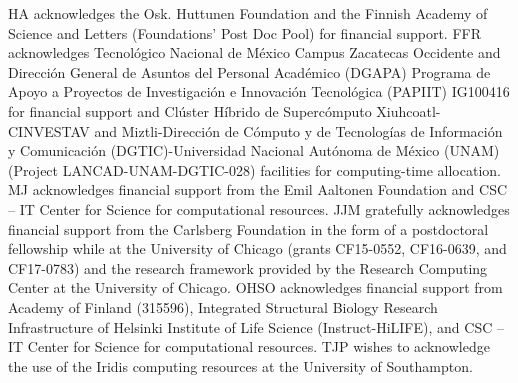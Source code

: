 \documentclass[journal=jpcbfk,manuscript=article]{achemso}
\begin{document}
\begin{acknowledgement}
  HA acknowledges the Osk. Huttunen Foundation and the Finnish Academy of Science and Letters (Foundations' Post Doc Pool) for financial support.
  FFR acknowledges Tecnol\'{o}gico Nacional de M\'{e}xico Campus Zacatecas Occidente and
  Direcci\'{o}n General de Asuntos del Personal Acad\'{e}mico (DGAPA)
  Programa de Apoyo a Proyectos de Investigaci\'{o}n e Innovaci\'{o}n
  Tecnol\'{o}gica (PAPIIT) IG100416 for financial support and Cl\'{u}ster
  H\'{i}brido de Superc\'{o}mputo Xiuhcoatl-CINVESTAV and Miztli-Direcci\'{o}n de
  C\'{o}mputo y de Tecnolog\'{i}as de Informaci\'{o}n y Comunicaci\'{o}n (DGTIC)-Universidad Nacional Aut\'{o}noma de M\'{e}xico (UNAM) (Project
  LANCAD-UNAM-DGTIC-028) facilities for computing-time allocation.
  MJ acknowledges financial support from the Emil Aaltonen Foundation
  and CSC -- IT Center for Science for computational resources.
  JJM gratefully acknowledges financial support from the Carlsberg Foundation in the form of a postdoctoral fellowship while at the University of Chicago (grants CF15-0552, CF16-0639, and CF17-0783) and the research framework provided by the Research Computing Center at the University of Chicago.
  OHSO acknowledges financial support from Academy of Finland (315596),
  Integrated Structural Biology Research Infrastructure of
  Helsinki Institute of Life Science (Instruct-HiLIFE), and
  CSC -- IT Center for Science for computational resources.
  TJP wishes to acknowledge the use of the Iridis computing resources at the University of Southampton.
\end{acknowledgement}






\end{document}
